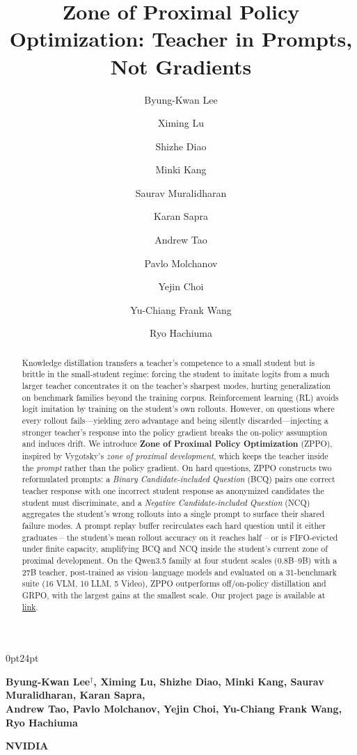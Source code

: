 \documentclass{llmxive}
\title{Zone of Proximal Policy Optimization: Teacher in Prompts, Not Gradients}
\author{Byung-Kwan Lee \and Ximing Lu \and Shizhe Diao \and Minki Kang \and Saurav Muralidharan \and Karan Sapra \and Andrew Tao \and Pavlo Molchanov \and Yejin Choi \and Yu-Chiang Frank Wang \and Ryo Hachiuma}
\makeatletter
\providecommand{\customfootnotetext}[2]{{\renewcommand{\thefootnote}{#1}\footnotetext[0]{#2}}}
\providecommand{\authorblock}{  Byung-Kwan Lee$^{\dagger}$,
  Ximing Lu,
  Shizhe Diao,
  Minki Kang,
  Saurav Muralidharan,
  Karan Sapra,\\
  Andrew Tao,
  Pavlo Molchanov,
  Yejin Choi,
  Yu-Chiang Frank Wang,
  Ryo Hachiuma}
\providecommand{\titlefont}{\normalfont\bfseries\fontsize{17}{20}\selectfont}
\providecommand{\maketitle}{\bgroup\setlength{\parindent}{0pt}
  \begin{adjustwidth}{0pt}{24pt}
  \begin{flushleft}
    {\raggedright \titlefont \@title\par}    \vskip11pt
    {\raggedright \normalfont\bfseries\fontsize{9}{13}\selectfont \authorblock\par}    \vskip12pt
    {\normalfont\bfseries\fontsize{9}{13}\selectfont NVIDIA\par}    \vskip16pt  \end{flushleft}
  \end{adjustwidth}
  \egroup
  \thispagestyle{firststyle}
}
\makeatother
\begin{document}
\maketitle
\begin{abstract}
    Knowledge distillation transfers a teacher's competence to a small student but is brittle in the small-student regime: forcing the student to imitate logits from a much larger teacher concentrates it on the teacher's sharpest modes, hurting generalization on benchmark families beyond the training corpus. Reinforcement learning (RL) avoids logit imitation by training on the student's own rollouts. However, on questions where every rollout fails—yielding zero advantage and being silently discarded—injecting a stronger teacher's response into the policy gradient breaks the on-policy assumption and induces drift. We introduce \textbf{Zone of Proximal Policy Optimization} (ZPPO), inspired by Vygotsky's \emph{zone of proximal development}, which keeps the teacher inside the \emph{prompt} rather than the policy gradient. On hard questions, ZPPO constructs two reformulated prompts: a \emph{Binary Candidate-included Question} (BCQ) pairs one correct teacher response with one incorrect student response as anonymized candidates the student must discriminate, and a \emph{Negative Candidate-included Question} (NCQ) aggregates the student's wrong rollouts into a single prompt to surface their shared failure modes. A prompt replay buffer recirculates each hard question until it either graduates -- the student's mean rollout accuracy on it reaches half -- or is FIFO-evicted under finite capacity, amplifying BCQ and NCQ inside the student's current zone of proximal development. On the Qwen3.5 family at four student scales (0.8B--9B) with a 27B teacher, post-trained as vision--language models and evaluated on a 31-benchmark suite (16 VLM, 10 LLM, 5 Video), ZPPO outperforms off/on-policy distillation and GRPO, with the largest gains at the smallest scale. Our project page is available at \href{https://byungkwanlee.github.io/ZPPO-page/}{link}.
\end{abstract}
\begin{center}
    
    \vspace{-3mm}
    \label{fig:teaser}
\end{center}
\end{document}
